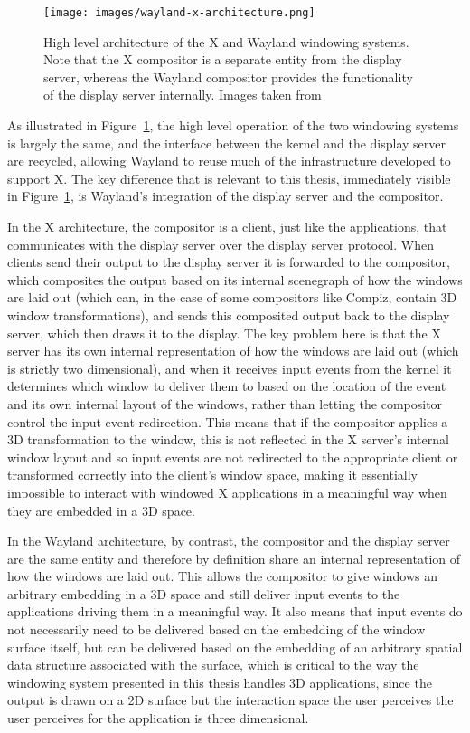 \begin{figure}[ht!]
\centering
\texttt{[image: images/wayland-x-architecture.png]}
\caption{High level architecture of the X and Wayland windowing systems. Note that the X compositor is a separate entity from the display server, whereas the Wayland compositor provides the functionality of the display server internally. Images taken from  \protect\cite{wayland}}
\label{fig:wayland-vs-x}
\end{figure}



As illustrated in Figure~\ref{fig:wayland-vs-x}, the high level operation of the two windowing systems is largely the same, and the interface between the kernel and the display server are recycled, allowing Wayland to reuse much of the infrastructure developed to support X. The key difference that is relevant to this thesis, immediately visible in Figure~\ref{fig:wayland-vs-x}, is Wayland's integration of the display server and the compositor. 

In the X architecture, the compositor is a client, just like the applications, that communicates with the display server over the display server protocol. When clients send their output to the display server it is forwarded to the compositor, which composites the output based on its internal scenegraph of how the windows are laid out (which can, in the case of some compositors like Compiz, contain 3D window transformations), and sends this composited output back to the display server, which then draws it to the display. The key problem here is that the X server has its own internal representation of how the windows are laid out (which is strictly two dimensional), and when it receives input events from the kernel it  determines which window to deliver them to based on the location of the event and its own internal layout of the windows, rather than letting the compositor control the input event redirection. This means that if the compositor applies a 3D transformation to the window, this is not reflected in the X server's internal window layout and so input events are not redirected to the appropriate client or transformed correctly into the client's window space, making it essentially impossible to interact with windowed X applications in a meaningful way when they are embedded in a 3D space. 

In the Wayland architecture, by contrast, the compositor and the display server are the same entity and therefore by definition share an internal representation of how the windows are laid out. This allows the compositor to give windows an arbitrary embedding in a 3D space and still deliver input events to the applications driving them in a meaningful way. It also means that input events do not necessarily need to be delivered based on the embedding of the window surface itself, but can be delivered based on the embedding of an arbitrary spatial data structure associated with the surface, which is critical to the way the windowing system presented in this thesis handles 3D applications, since the output is drawn on a 2D surface but the interaction space the user perceives the user perceives for the application is three dimensional.


